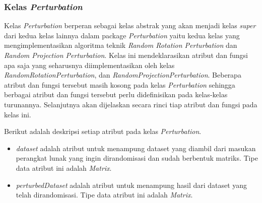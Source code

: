 \subsubsection{Kelas \textit{Perturbation}}
\label{subsubsec:kelas-perturbation}

Kelas \textit{Perturbation} berperan sebagai kelas abstrak yang akan menjadi kelas \textit{super} dari kedua kelas lainnya dalam package \textit{Perturbation} yaitu kedua kelas yang mengimplementasikan algoritma teknik \textit{Random Rotation Perturbation} dan \textit{Random Projection Perturbation}. Kelas ini mendeklarasikan atribut dan fungsi apa saja yang seharusnya diimplementasikan oleh kelas \textit{RandomRotationPerturbation}, dan \textit{RandomProjectionPerturbation}. Beberapa atribut dan fungsi tersebut masih kosong pada kelas \textit{Perturbation} sehingga berbagai atribut dan fungsi tersebut perlu didefinisikan pada kelas-kelas turunannya. Selanjutnya akan dijelaskan secara rinci tiap atribut dan fungsi pada kelas ini.

Berikut adalah deskripsi setiap atribut pada kelas \textit{Perturbation}.
\begin{itemize}
	\item \textit{dataset} adalah atribut untuk menampung dataset yang diambil dari masukan perangkat lunak yang ingin dirandomisasi dan sudah berbentuk matriks. Tipe data atribut ini adalah \textit{Matrix}.
	\item \textit{perturbedDataset} adalah atribut untuk menampung hasil dari dataset yang telah dirandomisasi. Tipe data atribut ini adalah \textit{Matrix}.
\end{itemize}

